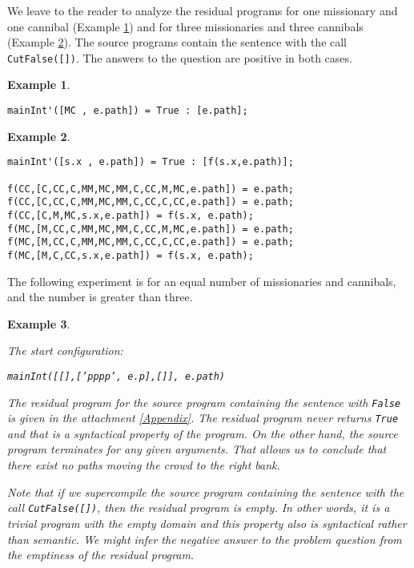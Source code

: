 \documentclass[preprint]{sigplanconf}
\newtheorem{example}{Example}
\begin{document}
We leave to the reader to analyze the residual programs for one missionary and one cannibal (Example \ref{Example2}) and for three missionaries and three cannibals (Example \ref{Example3}). The source programs contain the sentence with the call \texttt{CutFalse([])}. 
The answers to the question are positive in both cases.


\begin{example}\label{Example2}
\noindent
\begin{verbatim}
mainInt'([MC , e.path]) = True : [e.path];
\end{verbatim}
\end{example}

\begin{example}\label{Example3}
\noindent
\begin{verbatim}
mainInt'([s.x , e.path]) = True : [f(s.x,e.path)];

f(CC,[C,CC,C,MM,MC,MM,C,CC,M,MC,e.path]) = e.path;
f(CC,[C,CC,C,MM,MC,MM,C,CC,C,CC,e.path]) = e.path;
f(CC,[C,M,MC,s.x,e.path]) = f(s.x, e.path);
f(MC,[M,CC,C,MM,MC,MM,C,CC,M,MC,e.path]) = e.path;
f(MC,[M,CC,C,MM,MC,MM,C,CC,C,CC,e.path]) = e.path;
f(MC,[M,C,CC,s.x,e.path]) = f(s.x, e.path);
\end{verbatim}

\end{example}

The following experiment is for an equal number of missionaries and cannibals, and the number 
is greater than three.

\begin{example}\label{Example4}

The start configuration: 
\begin{center}
\texttt{mainInt([[],['pppp', e.p],[]], e.path)}
\end{center}
The residual program for the source program containing the sentence with \texttt{False} is given in the attachment \ref{Appendix}. The residual program never returns \texttt{True} and that is a \emph{syntactical} property of the program. On the other hand,  the source program terminates for \emph{any given} arguments. That allows us to conclude that there exist no paths moving the crowd to the right bank. 

Note that if we supercompile the source program containing the sentence with the call \texttt{CutFalse([])}, then the residual program is \emph{empty}. In other words, it is a trivial program with the empty domain and this property also is syntactical rather than semantic. We might infer the negative answer to the problem question from the emptiness of the residual program.

\end{example}
\end{document}
